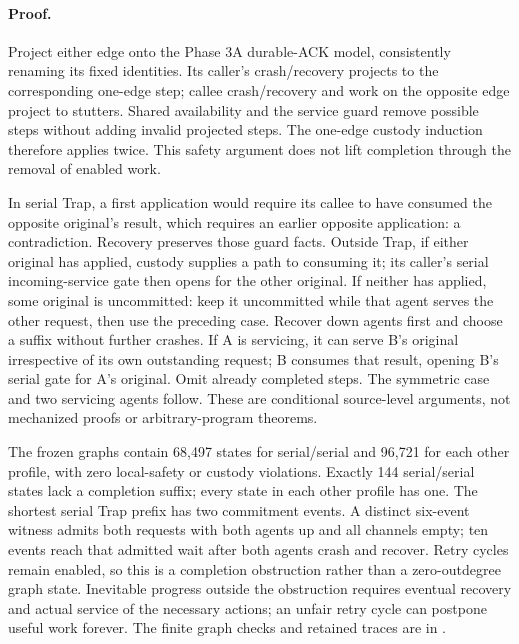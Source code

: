 \documentclass[11pt,a4paper]{article}
\theoremstyle{definition}
\theoremstyle{remark}
\begin{document}
\paragraph{Proof.} Project either edge onto the Phase 3A durable-ACK model, consistently renaming its fixed identities. Its caller's crash/recovery projects to the corresponding one-edge step; callee crash/recovery and work on the opposite edge project to stutters. Shared availability and the service guard remove possible steps without adding invalid projected steps. The one-edge custody induction therefore applies twice. This safety argument does not lift completion through the removal of enabled work.

In serial Trap, a first application would require its callee to have consumed the opposite original's result, which requires an earlier opposite application: a contradiction. Recovery preserves those guard facts. Outside Trap, if either original has applied, custody supplies a path to consuming it; its caller's serial incoming-service gate then opens for the other original. If neither has applied, some original is uncommitted: keep it uncommitted while that agent serves the other request, then use the preceding case. Recover down agents first and choose a suffix without further crashes. If A is servicing, it can serve B's original irrespective of its own outstanding request; B consumes that result, opening B's serial gate for A's original. Omit already completed steps. The symmetric case and two servicing agents follow. These are conditional source-level arguments, not mechanized proofs or arbitrary-program theorems.

The frozen graphs contain 68,497 states for serial/serial and 96,721 for each other profile, with zero local-safety or custody violations. Exactly 144 serial/serial states lack a completion suffix; every state in each other profile has one. The shortest serial Trap prefix has two commitment events. A distinct six-event witness admits both requests with both agents up and all channels empty; ten events reach that admitted wait after both agents crash and recover. Retry cycles remain enabled, so this is a completion obstruction rather than a zero-outdegree graph state. Inevitable progress outside the obstruction requires eventual recovery and actual service of the necessary actions; an unfair retry cycle can postpone useful work forever. The finite graph checks and retained traces are in .
\end{document}
